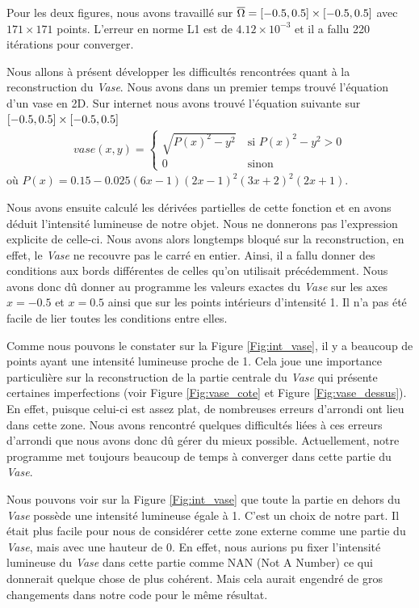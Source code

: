 Pour les deux figures, nous avons travaillé sur $\overline{\Omega}=\mathopen{}\left[-0.5,0.5\right]\mathclose{}\times \mathopen{}\left[-0.5,0.5\right]\mathclose{}$ avec\\ $171\times 171$ points. L'erreur en norme L1 est de $4.12 \times 10^{-3}$ et il a fallu 220 itérations pour converger. 

Nous allons à présent développer les difficultés rencontrées quant à la reconstruction du \textit{Vase}. Nous avons dans un premier temps trouvé l'équation d'un vase en 2D. Sur internet nous avons trouvé l'équation suivante sur $\mathopen{}\left[-0.5,0.5\right]\mathclose{}\times \mathopen{}\left[-0.5,0.5\right]\mathclose{}$
\begin{align}
    vase(x,y) =\left\{
    \begin{array}{ll}
         \mathopen{}\sqrt{P(x)^2 -y^2} & \ \text{si } P(x)^2-y^2>0\\  
         0& \ \text{sinon }
    \end{array}
    \right.
\end{align}
où $P(x) = 0.15 - 0.025(6x- 1) (2x - 1)^2 (3x + 2)^2 (2x + 1)$.

Nous avons ensuite calculé les dérivées partielles de cette fonction et en avons déduit l'intensité lumineuse de notre objet. Nous ne donnerons pas l'expression explicite de celle-ci. Nous avons alors longtemps bloqué sur la reconstruction, en effet, le \textit{Vase} ne recouvre pas le carré en entier. Ainsi, il a fallu donner des conditions aux bords différentes de celles qu'on utilisait précédemment. Nous avons donc dû donner au programme les valeurs exactes du \textit{Vase} sur les axes $x=-0.5$ et $x=0.5$ ainsi que sur les points intérieurs d'intensité 1. Il n'a pas été facile de lier toutes les conditions entre elles. 

Comme nous pouvons le constater sur la Figure \ref{Fig:int_vase}, il y a beaucoup de points ayant une intensité lumineuse proche de 1. Cela joue une importance particulière sur la reconstruction de la partie centrale du \textit{Vase} qui présente certaines imperfections (voir Figure \ref{Fig:vase_cote} et Figure \ref{Fig:vase_dessus}). En effet, puisque celui-ci est assez plat, de nombreuses erreurs d'arrondi ont lieu dans cette zone. Nous avons rencontré quelques difficultés liées à ces erreurs d'arrondi que nous avons donc dû gérer du mieux possible. Actuellement, notre programme met toujours beaucoup de temps à converger dans cette partie du \textit{Vase}.

\begin{noremark}
    Nous pouvons voir sur la Figure \ref{Fig:int_vase} que toute la partie en dehors du \textit{Vase} possède une intensité lumineuse égale à 1. C'est un choix de notre part. Il était plus facile pour nous de considérer cette zone externe comme une partie du \textit{Vase}, mais avec une hauteur de 0. En effet, nous aurions pu fixer l'intensité lumineuse du \textit{Vase} dans cette partie comme  \og NAN \fg{} (Not A Number) ce qui donnerait quelque chose de plus cohérent. Mais cela aurait engendré de gros changements dans notre code pour le même résultat. 
\end{noremark}



